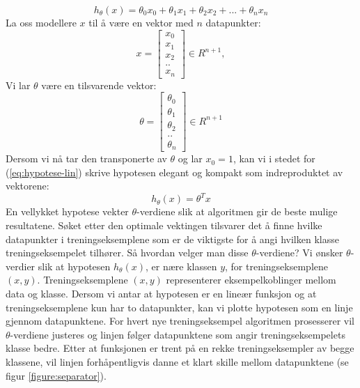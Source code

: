 \begin{equation}
h_\theta(x) = \theta_0x_0 + \theta_1x_1 + \theta_2x_2 + ... + \theta_nx_n
\label{eq:hypotese-lin}
\end{equation}
La oss modellere $x$ til å være en vektor med $n$ datapunkter: 
\[
x =
\begin{bmatrix}
x_0 \\
x_1 \\
x_2 \\
.. \\
x_{n}
\end{bmatrix}
\in R^{n+1},
\]
Vi lar $\theta$ være en tilsvarende vektor: 
\[
\theta =
\begin{bmatrix}
\theta_0 \\
\theta_1 \\
\theta_2 \\
.. \\
\theta_{n}
\end{bmatrix}
\in R^{n+1}
\]
Dersom vi nå tar den transponerte av $\theta$ og lar \(x_0 = 1\), kan vi i stedet for (\ref{eq:hypotese-lin}) skrive hypotesen elegant og kompakt som indreproduktet av vektorene:
\begin{equation}
h_\theta(x) = \theta^{T}x
\label{eq:hypotese-kompakt}
\end{equation}
En vellykket hypotese vekter $\theta$-verdiene slik at algoritmen gir de beste mulige resultatene. Søket etter den optimale vektingen tilsvarer det å finne hvilke datapunkter i treningseksemplene som er de viktigste for å angi hvilken klasse treningseksempelet tilhører. Så hvordan velger man disse $\theta$-verdiene? Vi ønsker $\theta$-verdier slik at hypotesen \(h_\theta(x)\), er nære klassen $y$, for treningseksemplene \((x,y)\). Treningseksemplene  \((x,y)\) representerer eksempelkoblinger mellom data og klasse. Dersom vi antar at hypotesen er en lineær funksjon og at treningseksemplene kun har to datapunkter, kan vi plotte hypotesen som en linje gjennom datapunktene. For hvert nye treningseksempel algoritmen prosesserer vil $\theta$-verdiene justeres og linjen følger datapunktene som angir treningseksempelets klasse bedre. Etter at funksjonen er trent på en rekke treningseksempler av begge klassene, vil linjen forhåpentligvis danne et klart skille mellom datapunktene (se figur \ref{figure:separator}).

